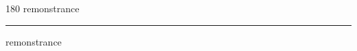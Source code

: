 
\begin{frame}
\begin{center}
\begin{turn}{180}
{\fontsize{2.5cm}{1em}\selectfont remonstrance}
\end{turn}
\vspace{1em}\par  
\hrule
\vspace{1em}\par  
{\fontsize{2.5cm}{1em}\selectfont remonstrance}
\end{center}
\end{frame}
